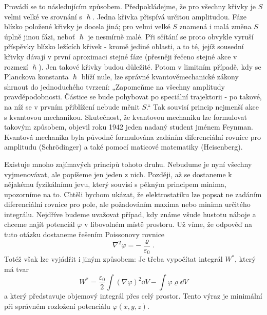     Provádí se to následujícím způsobem. Předpokládejme, že pro všechny křivky je \(S\) velmi velké
    ve srovnání s \(\hslash\). Jedna křivka přispívá určitou amplitudou. Fáze blízko položené křivky
    je docela jiná; pro velmi velké \(S\) znamená i malá změna \(S\) úplně jinou fázi, neboť
    \(\hslash\) je nesmírně malé. Při sčítání se proto obvykle vyruší příspěvky blízko ležících
    křivek - kromě jediné oblasti, a to té, jejíž sousední křivky dávají v první aproximaci stejné
    fáze (přesněji řečeno stejné akce v rozmezí \(\hslash\)). Jen takové křivky budou důležité.
    Potom v limitním případě, kdy se Planckova konstanta \(\hslash\) blíží nule, lze správné
    kvantověmechanické zákony shrnout do jednoduchého tvrzení: „Zapomeňme na všechny amplitudy
    pravděpodobnosti. Částice se bude pohybovat po speciální trajektorii - po takové, na níž se v
    prvním přiblížení nebude měnit \(S\).“ Tak souvisí princip nejmenší akce s kvantovou mechanikou.
    Skutečnost, že kvantovou mechaniku lze formulovat takovým způsobem, objevil roku 1942 jeden
    nadaný student jménem Feynman. Kvantová mechanika byla původně formulována zadáním diferenciální
    rovnice pro amplitudu (Schrödinger) a také pomocí maticové matematiky (Heisenberg).

    Existuje mnoho zajímavých principů tohoto druhu. Nebudume je nyní všechny vyjmenovávat, ale
    popíšeme jen jeden z nich. Později, až se dostaneme k nějakému fyzikálnímu jevu, který souvisí s
    pěkným principem minima, upozorníme na to. Chtěli bychom ukázat, že elektrostatiku lze popsat ne
    zadáním diferenciální rovnice pro pole, ale požadováním maxima nebo minima určitého integrálu.
    Nejdříve budeme uvažovat případ, kdy známe všude hustotu náboje a chceme najít potenciál
    \(\varphi\) v libovolném místě prostoru. Už víme, že odpověď na tuto otázku dostaneme řešením
    Poissonovy rovnice
    \begin{equation*}
      \nabla^2\varphi = -\dfrac{\varrho}{\varepsilon_0}.
    \end{equation*}
    Totéž však lze vyjádřit i jiným způsobem: Je třeba vypočítat integrál \(W^*\), který má tvar
    \begin{equation*}
      W^* = \dfrac{\varepsilon_0}{2}\int(\nabla\varphi)^2\dd{V} - \int\varphi\varrho\dd{V}
    \end{equation*}
    a který představuje objemový integrál přes celý prostor. Tento výraz je minimální při správném
    rozložení potenciálu \(\varphi(x, y, z)\).

